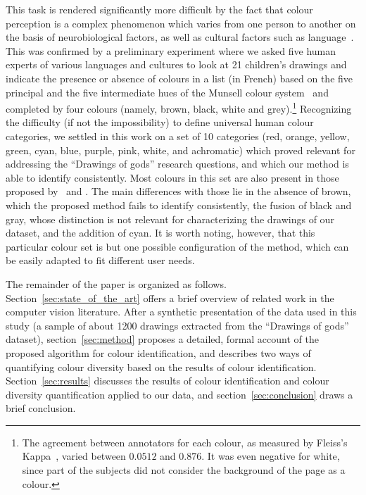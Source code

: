 \documentclass[11pt,a4paper]{article}
\begin{document}
This task is rendered significantly more difficult by the fact that colour perception is a complex phenomenon which varies from one person to another on the basis of neurobiological factors, as well as cultural factors such as language~\cite[][pp. 35 and 87]{pastoureau2017}. This was confirmed by a preliminary experiment where we asked five human experts of various languages and cultures to look at 21 children's drawings and indicate the presence or absence of colours in a list (in French) based on the five principal and the five intermediate hues of the Munsell colour system~\cite{Munsell1912} and completed by four colours (namely, brown, black, white and grey).\footnote{The agreement between annotators for each colour, as measured by Fleiss's Kappa~\cite{Fleiss1971}, varied between $0.0512$ and $0.876$. It was even negative for white, since part of the subjects did not consider the background of the page as a colour.} Recognizing the difficulty (if not the impossibility) to define universal human colour categories, we settled in this work on a set of 10 categories (red, orange, yellow, green, cyan, blue, purple, pink, white, and achromatic) which proved relevant for addressing the ``Drawings of gods'' research questions, and which our method is able to identify consistently. Most colours in this set are also present in those proposed by~\citet{berlinkay1969} and \citet{pastoureau2017}. The main differences with those lie in the absence of brown, which the proposed method fails to identify consistently, the fusion of black and gray, whose distinction is not relevant for characterizing the drawings of our dataset, and the addition of cyan. It is worth noting, however, that this particular colour set is but one possible configuration of the method, which can be easily adapted to fit different user needs.


The remainder of the paper is organized as follows. Section~\ref{sec:state_of_the_art} offers a brief overview of related work in the computer vision literature. After a synthetic presentation of the data used in this study (a sample of about 1200 drawings extracted from the ``Drawings of gods'' dataset), section~\ref{sec:method} proposes a detailed, formal account of the proposed algorithm for colour identification, and describes two ways of quantifying colour diversity based on the results of colour identification. Section~\ref{sec:results} discusses the results of colour identification and colour diversity quantification applied to our data, and section~\ref{sec:conclusion} draws a brief conclusion.
\end{document}
